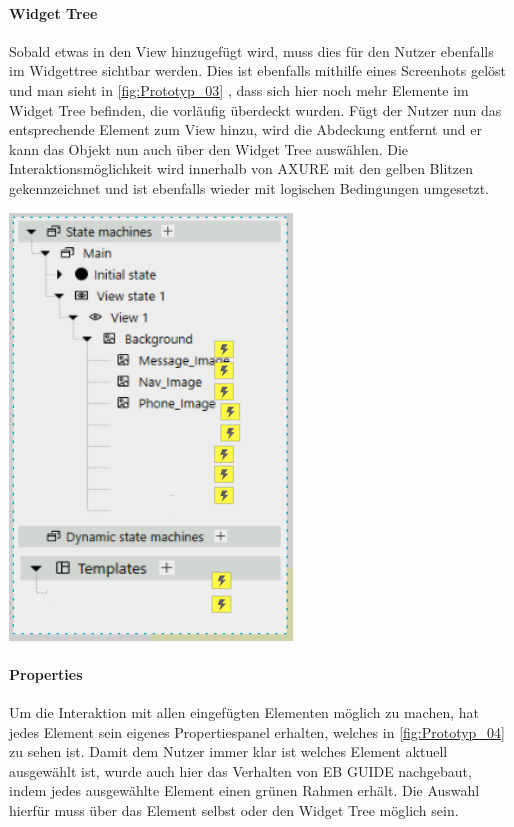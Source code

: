 \paragraph{Widget Tree}
Sobald etwas in den View hinzugefügt wird, muss dies für den Nutzer ebenfalls im Widgettree sichtbar werden.
Dies ist ebenfalls mithilfe eines Screenhots gelöst und man sieht in \cref{fig:Prototyp_03} , dass sich hier noch mehr Elemente im Widget Tree befinden, die vorläufig überdeckt wurden.
Fügt der Nutzer nun das entsprechende Element zum View hinzu, wird die Abdeckung entfernt und er kann das Objekt nun auch über den Widget Tree auswählen.
Die Interaktionsmöglichkeit wird innerhalb von AXURE mit den gelben Blitzen gekennzeichnet und ist ebenfalls wieder mit logischen Bedingungen umgesetzt.

\begin{center}
  \includegraphics[scale=0.8]{figures/Prototyp_03.PNG}
  \label{fig:Prototyp_03}
\end{center}

\paragraph{Properties}
Um die Interaktion mit allen eingefügten Elementen möglich zu machen, hat jedes Element sein eigenes Propertiespanel erhalten, welches in \cref{fig:Prototyp_04} zu sehen ist.
Damit dem Nutzer immer klar ist welches Element aktuell ausgewählt ist, wurde auch hier das Verhalten von EB GUIDE nachgebaut, indem jedes ausgewählte Element einen grünen Rahmen erhält.
Die Auswahl hierfür muss über das Element selbst oder den Widget Tree möglich sein.

